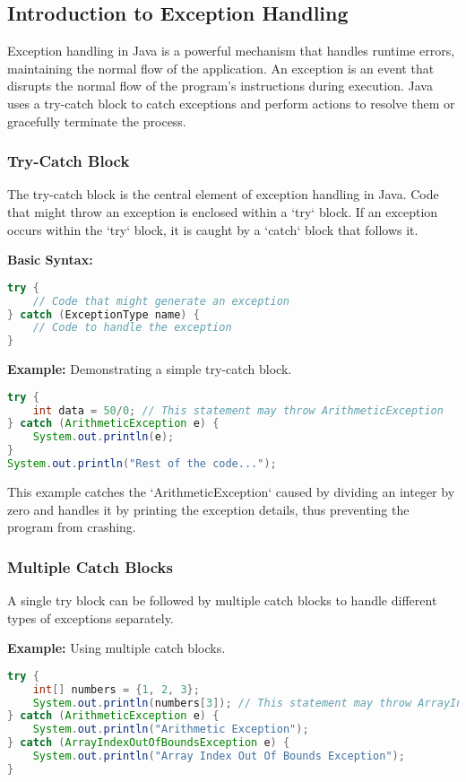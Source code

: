 \documentclass{article}
\begin{document}
\subsection{Introduction to Exception Handling}
Exception handling in Java is a powerful mechanism that handles runtime errors, maintaining the normal flow of the application. An exception is an event that disrupts the normal flow of the program's instructions during execution. Java uses a try-catch block to catch exceptions and perform actions to resolve them or gracefully terminate the process.

\subsubsection{Try-Catch Block}
The try-catch block is the central element of exception handling in Java. Code that might throw an exception is enclosed within a `try` block. If an exception occurs within the `try` block, it is caught by a `catch` block that follows it.

\textbf{Basic Syntax:}
\begin{lstlisting}[language=Java]
try {
    // Code that might generate an exception
} catch (ExceptionType name) {
    // Code to handle the exception
}
\end{lstlisting}

\textbf{Example:} Demonstrating a simple try-catch block.

\begin{lstlisting}[language=Java]
try {
    int data = 50/0; // This statement may throw ArithmeticException
} catch (ArithmeticException e) {
    System.out.println(e);
}
System.out.println("Rest of the code...");
\end{lstlisting}

This example catches the `ArithmeticException` caused by dividing an integer by zero and handles it by printing the exception details, thus preventing the program from crashing.

\subsubsection{Multiple Catch Blocks}
A single try block can be followed by multiple catch blocks to handle different types of exceptions separately.

\textbf{Example:} Using multiple catch blocks.

\begin{lstlisting}[language=Java]
try {
    int[] numbers = {1, 2, 3};
    System.out.println(numbers[3]); // This statement may throw ArrayIndexOutOfBoundsException
} catch (ArithmeticException e) {
    System.out.println("Arithmetic Exception");
} catch (ArrayIndexOutOfBoundsException e) {
    System.out.println("Array Index Out Of Bounds Exception");
}
\end{lstlisting}
\end{document}
